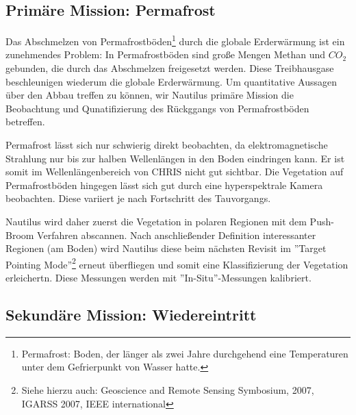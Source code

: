 \documentclass[twoside]{article}
\begin{document}
\begin{multicols}{2}


      \subsection{Primäre Mission: Permafrost}

      Das Abschmelzen von Permafrostböden\footnote{Permafrost: Boden, der länger als zwei
      Jahre durchgehend eine Temperaturen unter dem Gefrierpunkt von Wasser hatte.}
      durch die globale Erderwärmung ist ein zunehmendes Problem: In Permafrostböden
      sind große Mengen Methan und $CO_2$ gebunden, die durch das Abschmelzen freigesetzt werden. Diese Treibhausgase beschleunigen wiederum die globale Erderwärmung. Um quantitative Aussagen
      über den Abbau treffen zu können, wir Nautilus primäre Mission die
      Beobachtung und Qunatifizierung des Rückggangs von Permafrostböden betreffen.

      Permafrost lässt sich nur schwierig direkt beobachten, da elektromagnetische Strahlung nur bis zur halben Wellenlängen in den Boden eindringen kann.
      Er ist somit im Wellenlängenbereich von CHRIS nicht gut sichtbar. Die Vegetation auf 
      Permafrostböden hingegen lässt sich gut durch eine hyperspektrale
      Kamera beobachten. Diese variiert je nach Fortschritt des Tauvorgangs.

      Nautilus wird daher zuerst die Vegetation in polaren Regionen mit dem Push-Broom
      Verfahren abscannen. Nach anschließender Definition interessanter
      Regionen (am Boden) wird Nautilus diese beim nächsten Revisit im
      ''Target Pointing Mode''\footnote{Siehe hierzu auch: Geoscience and Remote Sensing Symbosium,
      2007, IGARSS 2007, IEEE international} erneut überfliegen und somit eine Klassifizierung der Vegetation erleichertn. Diese Messungen werden mit ''In-Situ''-Messungen
      kalibriert.

      \subsection{Sekundäre Mission: Wiedereintritt}


\end{multicols}
\end{document}
